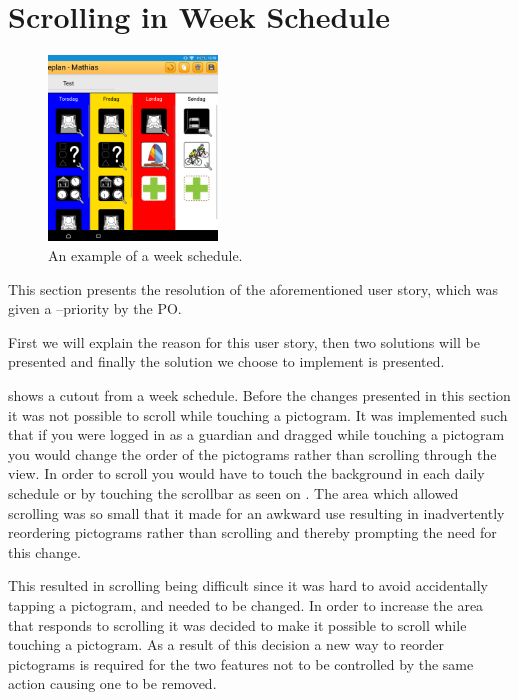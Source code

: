 \section{Scrolling in Week Schedule}

\begin{figure}
    \centering
        \includegraphics[width=0.4\textwidth]{figures/img/screenshots/weekplan_schedule.png}
    \caption{An example of a week schedule.}\label{fig:weekschedule}
    \vspace{-20pt}
\end{figure}

This section presents the resolution of the aforementioned user story, which was given a \phigh--priority by the PO.

First we will explain the reason for this user story, then two solutions will be presented and finally the solution we choose to implement is presented.

 shows a cutout from a week schedule.
Before the changes presented in this section it was not possible to scroll while touching a pictogram.
It was implemented such that if you were logged in as a guardian and dragged while touching a pictogram you would change the order of the pictograms rather than scrolling through the view.
In order to scroll you would have to touch the background in each daily schedule or by touching the scrollbar as seen on .
The area which allowed scrolling was so small that it made for an awkward use resulting in inadvertently reordering pictograms rather than scrolling and thereby prompting the need for this change.

This resulted in scrolling being difficult since it was hard to avoid accidentally tapping a pictogram, and needed to be changed.
In order to increase the area that responds to scrolling  it was decided to make it possible to scroll while touching a pictogram.
As a result of this decision a new way to reorder pictograms is required for the two features not to be controlled by the same action causing one to be removed.

